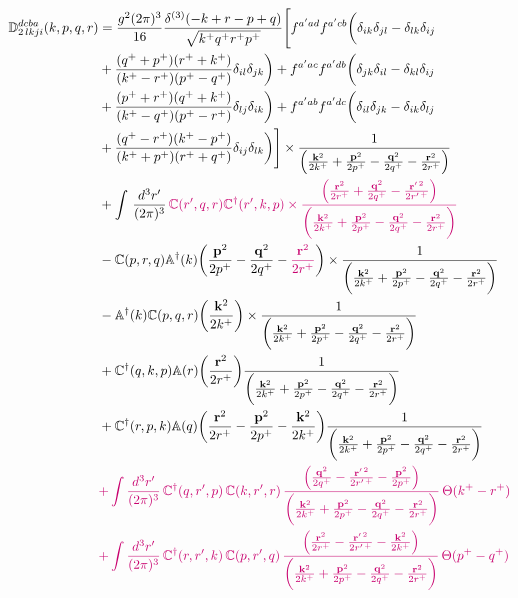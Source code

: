 \documentclass[a4paper,11pt]{article}
\def\v#1{\mathbf{#1}}
\def\mf#1{\mathbb{#1}}
\begin{document}
\begin{align}
    \mf{D}^{dcba}_{2\,lkji}(k,p,q,r) & = 
\frac{g^{2}(2\pi)^{3}}{16}\frac{\delta^{(3)}(-k+r-p+q)}{\sqrt{k^{+}q^{+}r^{+}p^{+}}}\Bigg[f^{a'ad}f^{a'cb}\bigg(\delta_{ik}\delta_{jl}-\delta_{lk}\delta_{ij}\notag \\ & +\frac{(q^{+}+p^{+})(r^{+}+k^{+})}{(k^{+}-r^{+})(p^{+}-q^{+})}\delta_{il}\delta_{jk}\bigg) +f^{a'ac}f^{a'db}\bigg(\delta_{jk}\delta_{il}-\delta_{kl}\delta_{ij}\notag \\ & +\frac{(p^{+}+r^{+})(q^{+}+k^{+})}{(k^{+}-q^{+})(p^{+}-r^{+})}\delta_{lj}\delta_{ik}\bigg) + f^{a'ab}f^{a'dc}\bigg(\delta_{il}\delta_{jk}-\delta_{ik}\delta_{lj}\notag \\ & +\frac{(q^{+}-r^{+})(k^{+}-p^{+})}{(k^{+}+p^{+})(r^{+}+q^{+})}\delta_{ij}\delta_{lk}\bigg) \Bigg]\times  \frac{1}{\left(\frac{\v{k}^{2}}{2k^{+}}+\frac{\v{p}^{2}}{2p^{+}}-\frac{\v{q}^{2}}{2q^{+}}-\frac{\v{r}^{2}}{2r^{+}}\right)}\notag \\ &  + \int\,\frac{d^{3}r^{\prime}}{(2\pi)^{3}}\,{\color{chg}\mf{C}(r^{\prime},q,r)\mf{C}^{\dagger}(r^{\prime},k,p)  \times \frac{\left(\frac{\v{r}^{2}}{2r^{+}}+\frac{\v{q}^{2}}{2q^{+}}-\frac{\v{r}^{\prime\, 2}}{2r^{\prime\, +}}\right)}{\bigg(\frac{\v{k}^{2}}{2k^{+}}+\frac{\v{p}^{2}}{2p^{+}}-\frac{\v{q}^{2}}{2q^{+}}-\frac{\v{r}^{2}}{2r^{+}}\bigg)}} \notag \\ & -\mf{C}(p,r,q)\mf{A}^{\dagger}(k)\bigg(\frac{\v{p}^2}{2p^+}-\frac{\v{q}^2}{2q^+}-{\color{chg}\frac{\v{r}^2}{2r^+}}\bigg) \times \frac{1}{\bigg(\frac{\v{k}^2}{2k^+}+\frac{\v{p}^2}{2p^+}-\frac{\v{q}^2}{2q^+}-\frac{\v{r}^2}{2r^+}\bigg)}\notag \\ & - \mf{A}^{\dagger}(k)\mf{C}(p,q,r)\bigg(\frac{\v{k}^{2}}{2k^{+}}\bigg) \times \frac{1}{\bigg(\frac{\v{k}^2}{2k^+}+\frac{\v{p}^2}{2p^+}-\frac{\v{q}^2}{2q^+}-\frac{\v{r}^2}{2r^+}\bigg)}\notag \\ & +\mf{C}^{\dagger}(q,k,p)\mf{A}(r) \bigg(\frac{\v{r}^{2}}{2r^{+}}\bigg)\frac{1}{\bigg(\frac{\v{k}^{2}}{2k^{+}}+\frac{\v{p}^{2}}{2p^{+}}-\frac{\v{q}^{2}}{2q^{+}}-\frac{\v{r}^{2}}{2r^{+}}\bigg)}\notag \\ & + \mf{C}^{\dagger}(r,p,k)\mf{A}(q)\bigg(\frac{\v{r}^{2}}{2r^{+}}-\frac{\v{p}^{2}}{2p^{+}}-\frac{\v{k}^{2}}{2k^{+}}\bigg)\frac{1}{\bigg(\frac{\v{k}^{2}}{2k^{+}}+\frac{\v{p}^{2}}{2p^{+}}-\frac{\v{q}^{2}}{2q^{+}}-\frac{\v{r}^{2}}{2r^{+}}\bigg)}\notag \\ & {\color{chg}+\int\frac{d^{3}r^{\prime}}{(2\pi)^{3}}\,\mf{C}^{\dagger}(q,r^{\prime},p)\,\mf{C}(k,r^{\prime},r)\,\frac{\left(\frac{\v{q}^{2}}{2q^{+}}-\frac{\v{r}^{\prime\,2}}{2r^{\prime\,+}}-\frac{\v{p}^{2}}{2p^{+}}\right)}{\bigg(\frac{\v{k}^{2}}{2k^{+}}+\frac{\v{p}^{2}}{2p^{+}}-\frac{\v{q}^{2}}{2q^{+}}-\frac{\v{r}^{2}}{2r^{+}}\bigg)}\,\Theta(k^{+}-r^{+})}\notag \\ & {\color{chg}+\int\frac{d^{3}r^{\prime}}{(2\pi)^{3}}\,\mf{C}^{\dagger}(r,r^{\prime},k)\,\mf{C}(p,r^{\prime},q)\,\frac{\left(\frac{\v{r}^{2}}{2r^{+}}-\frac{\v{r}^{\prime\,2}}{2r^{\prime\,+}}-\frac{\v{k}^{2}}{2k^{+}}\right)}{\bigg(\frac{\v{k}^{2}}{2k^{+}}+\frac{\v{p}^{2}}{2p^{+}}-\frac{\v{q}^{2}}{2q^{+}}-\frac{\v{r}^{2}}{2r^{+}}\bigg)}\,\Theta(p^{+}-q^{+})}\notag \\ & 
\end{align}
\end{document}
